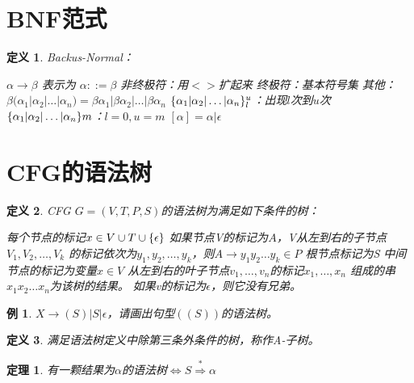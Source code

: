 \documentclass[oneside]{ctexbook}
\DeclarePairedDelimiter{\set}{\{}{\}}
\newtheorem{definition}{定义}[section]
\newtheorem{example}{例}[section]
\newtheorem{theorem}{定理}[section]
\begin{document}
\section{BNF范式}
\begin{definition}
    Backus-Normal：
    \begin{outline}
    \1 $\alpha \to \beta$ 表示为 $\alpha ::= \beta$
    \1 非终极符：用$<>$扩起来
    \1 终极符：基本符号集
    \1 其他：
        \2 $\beta(\alpha_1|\alpha_2|\dots|\alpha_n) = \beta\alpha_1 | \beta\alpha_2 | \dots | \beta\alpha_n$
        \2 $\set{\alpha_1 | \alpha_2 | \dots | \alpha_n}^u_l$：出现$l$次到$u$次
        \2 $\set{\alpha_1 | \alpha_2 | \dots | \alpha_n}m$：$l=0, u=m$
        \2 $[\alpha] = \alpha | \epsilon$
    \end{outline}
\end{definition}

\section{CFG的语法树}

\begin{definition}
    CFG $G=(V, T, P, S)$的语法树为满足如下条件的树：

    \begin{outline}[enumerate]
        \1 每个节点的标记$x \in V \cup T \cup \set{\epsilon}$
        \1 如果节点V的标记为$A$，V从左到右的子节点$V_1,V_2,\dots,V_k$
        的标记依次为$y_1,y_2,\dots,y_k$，则$A \to y_1y_2\dots y_k \in P$
        \1 根节点标记为S
        \1 中间节点的标记为变量$x \in V$
        \1 从左到右的叶子节点$v_1,\dots,v_n$的标记$x_1,\dots,x_n$
        组成的串$x_1x_2\dots x_n$为该树的结果。
        \1 如果v的标记为$\epsilon$，则它没有兄弟。
    \end{outline}
\end{definition}
\begin{example}
    $X \to (S) | S | \epsilon$，请画出句型$((S))$的语法树。
\end{example}
\begin{definition}
    满足语法树定义中除第三条外条件的树，称作A-子树。
\end{definition}
\begin{theorem}
    有一颗结果为$\alpha$的语法树$\iff S \overset{*} \Rightarrow \alpha $
\end{theorem}
\end{document}
